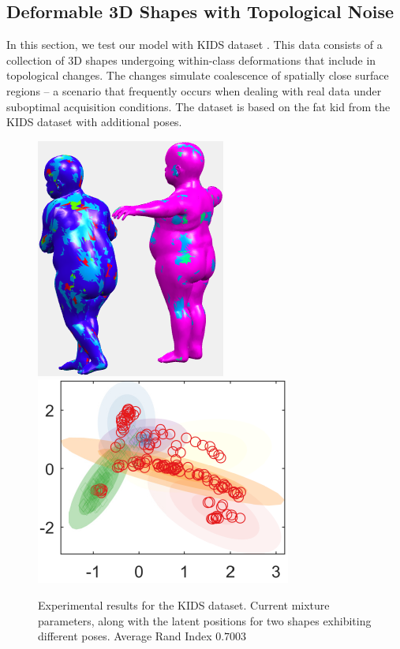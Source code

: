 \documentclass[]{article}
\begin{document}
\subsection{Deformable 3D Shapes  with Topological Noise}

In this section, we test our model with KIDS dataset \cite{SHREC16}. This data consists of a collection of 3D shapes undergoing within-class deformations that include in topological changes. The changes simulate coalescence of spatially close surface regions – a scenario that frequently occurs when dealing with real data under suboptimal acquisition conditions. The dataset is based on the fat kid from the KIDS dataset with additional poses.

\begin{figure}[ht!]
	\centering
	
	\includegraphics[width=0.3\linewidth]{img/kidMVMMexp1}
	\includegraphics[width=0.35\linewidth]{img/kidMVMMexp3}
	\caption{Experimental results for the KIDS dataset. Current mixture parameters, along with the latent positions for two shapes exhibiting different poses. Average Rand Index $0.7003$ }
\end{figure}
\end{document}
